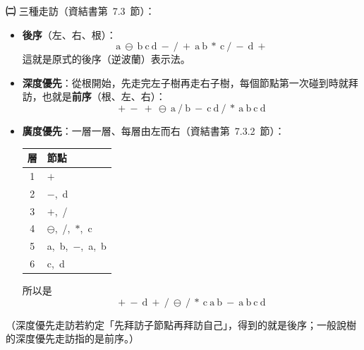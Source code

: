\begin{pastsoln}
\textbf{㈡} 三種走訪（資結書第~7.3~節）：
\begin{itemize}
\item \textbf{後序}（左、右、根）：
\[
\text{a}\ \ominus\ \text{b}\ \text{c}\ \text{d}\ -\ /\ +\ \text{a}\ \text{b}\ *\ \text{c}\ /\ -\ \text{d}\ +
\]
這就是原式的後序（逆波蘭）表示法。
\item \textbf{深度優先}：從根開始，先走完左子樹再走右子樹，每個節點第一次碰到時就拜訪，也就是\textbf{前序}（根、左、右）：
\[
+\ -\ +\ \ominus\ \text{a}\ /\ \text{b}\ -\ \text{c}\ \text{d}\ /\ *\ \text{a}\ \text{b}\ \text{c}\ \text{d}
\]
\item \textbf{廣度優先}：一層一層、每層由左而右（資結書第~7.3.2~節）：
\begin{center}
\small
\begin{tabular}{cl}
\toprule
層 & 節點 \\
\midrule
1 & $+$ \\
2 & $-$,\ d \\
3 & $+$,\ / \\
4 & $\ominus$,\ /,\ $*$,\ c \\
5 & a,\ b,\ $-$,\ a,\ b \\
6 & c,\ d \\
\bottomrule
\end{tabular}
\end{center}
所以是
\[
+\ -\ \text{d}\ +\ /\ \ominus\ /\ *\ \text{c}\ \text{a}\ \text{b}\ -\ \text{a}\ \text{b}\ \text{c}\ \text{d}
\]
\end{itemize}
（深度優先走訪若約定「先拜訪子節點再拜訪自己」，得到的就是後序；一般說樹的深度優先走訪指的是前序。）
\end{pastsoln}
